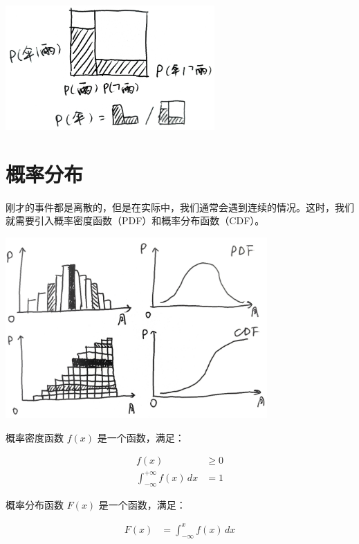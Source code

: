 \documentclass[UTF8]{ctexart}
\begin{document}
\begin{center}
	\includegraphics[width=0.6\textwidth]{fig5.jpg}
\end{center}

\newpage
\section{概率分布}

刚才的事件都是离散的，但是在实际中，我们通常会遇到连续的情况。这时，我们就需要引入概率密度函数（PDF）和概率分布函数（CDF）。

\begin{center}
	\includegraphics[width=0.75\textwidth]{fig2a.jpg}
\end{center}

概率密度函数 $f(x)$ 是一个函数，满足：

\begin{equation}
	\begin{aligned}
		f(x)                                & \geq 0 \\
		\int_{-\infty}^{+\infty} f(x) \, dx & = 1
	\end{aligned}
\end{equation}

概率分布函数 $F(x)$ 是一个函数，满足：

\begin{equation}
	\begin{aligned}
		F(x) & = \int_{-\infty}^{x} f(x) \, dx
	\end{aligned}
\end{equation}
\end{document}
